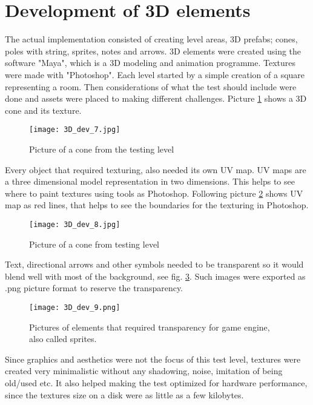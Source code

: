 \section{Development of 3D elements}
The actual implementation consisted of creating level areas, 3D prefabs; cones, poles with string, sprites, notes and arrows. 3D elements were created using the software "Maya", which is a 3D modeling and animation programme. Textures were made with "Photoshop". Each level started by a simple creation of a square representing a room. Then considerations of what the test should include were done and assets were placed to making different challenges. Picture \ref{3dDevelopment1} shows a 3D cone and its texture.
\begin{figure}[H]
\centering
\texttt{[image: 3D\_dev\_7.jpg]}
\caption{Picture of a cone from the testing level}
\label {3dDevelopment1}
\end{figure}
Every object that required texturing, also needed its own UV map. UV maps are a three dimensional model representation in two dimensions. This helps to see where to paint textures using tools as Photoshop. Following picture \ref{3dDevelopment2} shows UV map as red lines, that helps to see the boundaries for the texturing in Photoshop.
\begin{figure}[H]
\centering
\texttt{[image: 3D\_dev\_8.jpg]}
\caption{Picture of a cone from testing level}
\label {3dDevelopment2}
\end{figure}
Text, directional arrows and other symbols needed to be transparent so it would blend well with most of the background, see fig. \ref {3dDevelopment3}. Such images were exported as .png picture format to reserve the transparency. 

\begin{figure}[H]
\centering
\texttt{[image: 3D\_dev\_9.png]}
\caption{Pictures of elements that required transparency for game engine, also called sprites.}
\label {3dDevelopment3}
\end{figure}

Since graphics and aesthetics were not the focus of this test level, textures were created very minimalistic without any shadowing, noise, imitation of being old/used etc. It also helped making the test optimized for hardware performance, since the textures size on a disk were as little as a few kilobytes.

